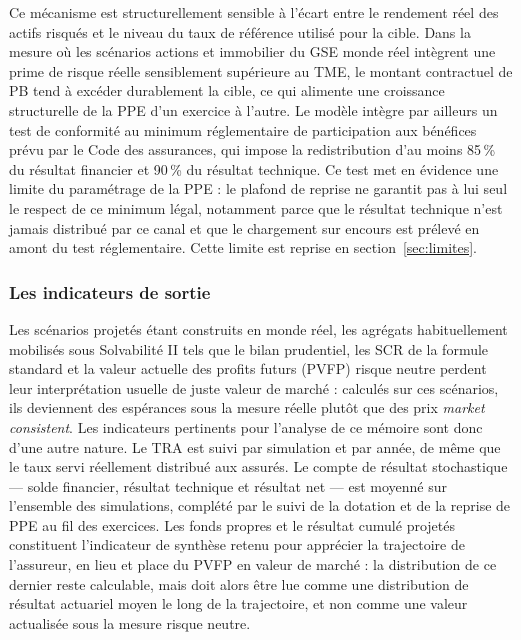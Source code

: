 Ce mécanisme est structurellement sensible à l'écart entre le rendement réel des actifs risqués et le niveau du taux de référence utilisé pour la cible. Dans la mesure où les scénarios actions et immobilier du GSE monde réel intègrent une prime de risque réelle sensiblement supérieure au TME, le montant contractuel de PB tend à excéder durablement la cible, ce qui alimente une croissance structurelle de la PPE d'un exercice à l'autre. Le modèle intègre par ailleurs un test de conformité au minimum réglementaire de participation aux bénéfices prévu par le Code des assurances, qui impose la redistribution d'au moins 85\,\% du résultat financier et 90\,\% du résultat technique. Ce test met en évidence une limite du paramétrage de la PPE : le plafond de reprise ne garantit pas à lui seul le respect de ce minimum légal, notamment parce que le résultat technique n'est jamais distribué par ce canal et que le chargement sur encours est prélevé en amont du test réglementaire. Cette limite est reprise en section~\ref{sec:limites}.

\subsubsection{Les indicateurs de sortie}

Les scénarios projetés étant construits en monde réel, les agrégats habituellement mobilisés sous Solvabilité II tels que le bilan prudentiel, les SCR de la formule standard et la valeur actuelle des profits futurs (PVFP) risque neutre perdent leur interprétation usuelle de juste valeur de marché : calculés sur ces scénarios, ils deviennent des espérances sous la mesure réelle plutôt que des prix \textit{market consistent}. Les indicateurs pertinents pour l'analyse de ce mémoire sont donc d'une autre nature. Le TRA est suivi par simulation et par année, de même que le taux servi réellement distribué aux assurés. Le compte de résultat stochastique — solde financier, résultat technique et résultat net — est moyenné sur l'ensemble des simulations, complété par le suivi de la dotation et de la reprise de PPE au fil des exercices. Les fonds propres et le résultat cumulé projetés constituent l'indicateur de synthèse retenu pour apprécier la trajectoire de l'assureur, en lieu et place du PVFP en valeur de marché : la distribution de ce dernier reste calculable, mais doit alors être lue comme une distribution de résultat actuariel moyen le long de la trajectoire, et non comme une valeur actualisée sous la mesure risque neutre.

